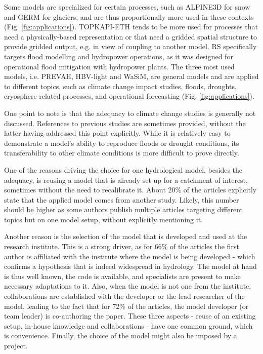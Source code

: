 \documentclass[10pt,a4paper]{article}
\begin{document}
Some models are specialized for certain processes, such as ALPINE3D for snow and GERM for glaciers, and are thus proportionally more used in these contexts (Fig. \ref{fig:applications}). TOPKAPI-ETH tends to be more used for processes that need a physically-based representation or that need a gridded spatial structure to provide gridded output, e.g. in view of coupling to another model. RS specifically targets flood modelling and hydropower operations, as it was designed for operational flood mitigation with hydropower plants. The three most used models, i.e. PREVAH, HBV-light and WaSiM, are general models and are applied to different topics, such as climate change impact studies, floods, droughts, cryosphere-related processes, and operational forecasting (Fig. \ref{fig:applications}).

One point to note is that the adequacy to climate change studies is generally not discussed. References to previous studies are sometimes provided, without the latter having addressed this point explicitly. While it is relatively easy to demonstrate a model's ability to reproduce floods or drought conditions, its transferability to other climate conditions is more difficult to prove directly. 

One of the reasons driving the choice for one hydrological model, besides the adequacy, is reusing a model that is already set up for a catchment of interest, sometimes without the need to recalibrate it. About 20\% of the articles explicitly state that the applied model comes from another study. Likely, this number should be higher as some authors publish multiple articles targeting different topics but on one model setup, without explicitly mentioning it.

Another reason is the selection of the model that is developed and used at the research institute. This is a strong driver, as for 66\% of the articles the first author is affiliated with the institute where the model is being developed - which confirms a hypothesis that is indeed widespread in hydrology. The model at hand is thus well known, the code is available, and specialists are present to make necessary adaptations to it. Also, when the model is not one from the institute, collaborations are established with the developer or the lead researcher of the model, leading to the fact that for 72\% of the articles, the model developer (or team leader) is co-authoring the paper. These three aspects - reuse of an existing setup, in-house knowledge and collaborations - have one common ground, which is convenience. Finally, the choice of the model might also be imposed by a project.
\end{document}
